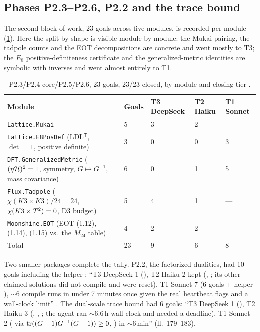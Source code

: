 \subsection{Phases P2.3--P2.6, P2.2 and the trace bound}

The second block of work, 23 goals across five modules, is recorded per module
(\cref{tab:pipeline:p23}). Here the split by shape is visible module by module: the
Mukai pairing, the tadpole counts and the EOT decompositions are concrete and went mostly
to T3; the $E_8$ positive-definiteness certificate and the generalized-metric identities
are symbolic with inverses and went almost entirely to T1.

\begin{table}[ht]\centering\small
\caption{P2.3/P2.4-core/P2.5/P2.6, 23 goals, 23/23 closed, by module and closing tier
.}
\label{tab:pipeline:p23}
\begin{tabular}{@{}p{5.4cm}p{1.1cm}p{1.6cm}p{1.6cm}p{1.6cm}@{}}\toprule
Module & Goals & T3 DeepSeek & T2 Haiku & T1 Sonnet \\ \midrule
\texttt{Lattice.Mukai} & 5 & 3 & 2 & --- \\
\texttt{Lattice.E8PosDef} (LDL$^{\mathsf T}$, $\det=1$, positive definite) & 3 & 0 & 0 & 3 \\
\texttt{DFT.GeneralizedMetric} ($(\eta\mathcal{H})^2=1$, symmetry, $G\mapsto G^{-1}$, mass covariance) & 6 & 0 & 1 & 5 \\
\texttt{Flux.Tadpole} ($\chi(K3\times K3)/24=24$, $\chi(K3\times T^2)=0$, D3 budget) & 5 & 4 & 1 & --- \\
\texttt{Moonshine.EOT} (EOT (1.12), (1.14), (1.15) vs.\ the $M_{24}$ table) & 4 & 2 & 2 & --- \\ \midrule
Total & 23 & 9 & 6 & 8 \\
\bottomrule\end{tabular}
\end{table}

Two smaller packages complete the tally. P2.2, the factorized dualities, had 10 goals
including the helper : ``T3 DeepSeek 1 (), T2 Haiku 2
kept (, ; its other claimed solutions did not
compile and were reset), T1 Sonnet 7 (6 goals + helper ), $\sim$6 compile
runs in under 7 minutes once given the real heartbeat flags and a wall-clock limit''
. The dual-scale trace bound had 6 goals:
``T3 DeepSeek 1 (), T2 Haiku 3 (,
, ; the agent ran $\sim$6.6\,h
wall-clock and needed a deadline), T1 Sonnet 2 ( via
$\operatorname{tr}((G-1)G^{-1}(G-1))\ge0$, ) in $\sim$6\,min'' (ll.~179--183).

